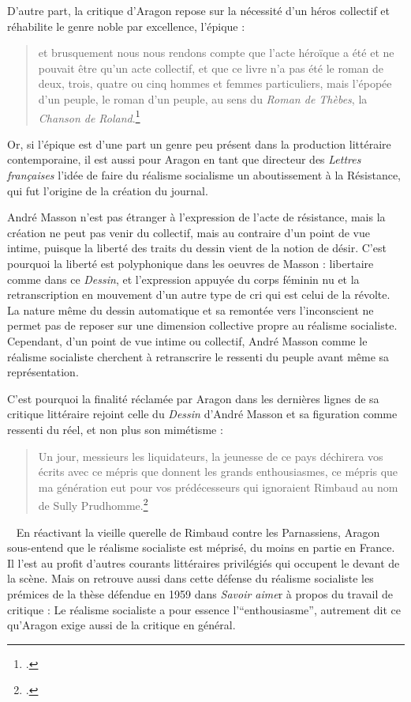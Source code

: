 	D’autre part, la critique d’Aragon repose sur la nécessité d’un héros collectif et réhabilite le genre noble par excellence, l’épique : 
	\begin{quote}
	et brusquement nous nous rendons compte que l’acte héroïque a été et ne pouvait être qu’un acte collectif, et que ce livre n’a pas été le roman de deux, trois, quatre ou cinq hommes et femmes particuliers, mais l’épopée d’un peuple, le roman d’un peuple, au sens du \emph{Roman de Thèbes}, la \emph{Chanson de Roland}.\footcite{realsoc}\end{quote}
	
	
	 Or, si l’épique est d’une part un genre peu présent dans la production littéraire contemporaine, il est aussi pour Aragon en tant que directeur des \emph{Lettres françaises} l'idée de faire du réalisme socialisme un aboutissement à la Résistance, qui fut l’origine de la création du journal. 

	André Masson n’est pas étranger à l’expression de l’acte de résistance, mais la création ne peut pas venir du collectif, mais au contraire d’un point de vue intime, puisque la liberté des traits du dessin vient de la notion de désir. C’est pourquoi la liberté est polyphonique dans les oeuvres de Masson : libertaire comme dans ce \emph{Dessin}, et l’expression appuyée du corps féminin nu et la retranscription en mouvement d’un autre type de cri qui est celui de la révolte. La nature même du dessin automatique et sa remontée vers l’inconscient ne permet pas de reposer sur une dimension collective propre au réalisme socialiste. Cependant, d’un point de vue intime ou collectif, André Masson comme le réalisme socialiste cherchent à retranscrire le ressenti du peuple avant même sa représentation. 

	C’est pourquoi la finalité réclamée par Aragon dans les dernières lignes de sa critique littéraire rejoint celle du \emph{Dessin} d’André Masson et sa figuration comme ressenti du réel, et non plus son mimétisme : 
\begin{quote}
Un jour, messieurs les liquidateurs, la jeunesse de ce pays déchirera vos écrits avec ce mépris que donnent les grands enthousiasmes, ce mépris que ma génération eut pour vos prédécesseurs qui ignoraient Rimbaud au nom de Sully Prudhomme.\footcite{realsoc}\end{quote}
 
	 En réactivant la vieille querelle de Rimbaud contre les Parnassiens, Aragon sous-entend que le réalisme socialiste est méprisé, du moins en partie en France. Il l'est au profit d’autres courants littéraires privilégiés qui occupent le devant de la scène. Mais on retrouve aussi dans cette défense du réalisme socialiste les prémices de la thèse défendue en 1959 dans \emph{Savoir aime}r à propos du travail de critique : Le réalisme socialiste a pour essence l’\enquote{enthousiasme}, autrement dit ce qu’Aragon exige aussi de la critique en général.  

